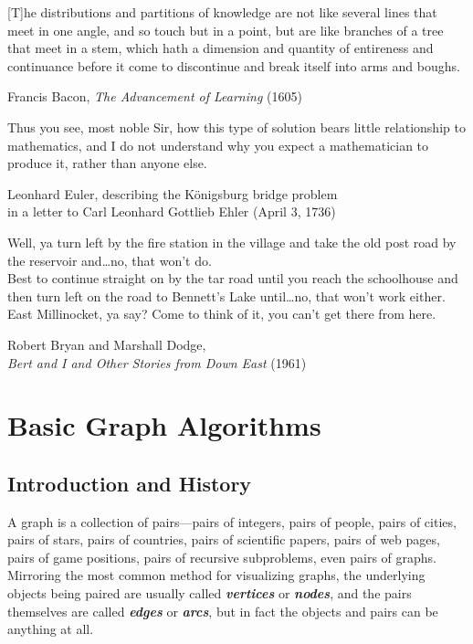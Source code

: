 \epigraph{[T]he distributions and partitions of knowledge are not like several lines that meet in one angle, and so touch but in a point, but are like branches of a tree that meet in a stem, which hath a dimension and quantity of entireness and continuance before it come to discontinue and break itself into arms and boughs.}{Francis Bacon, \textit{The Advancement of Learning} (1605)}

\epigraph{Thus you see, most noble Sir, how this type of solution bears little relationship to mathematics, and I do not understand why you expect a mathematician to produce it, rather than anyone else.}{Leonhard Euler, describing the Königsburg bridge problem\\in a letter to Carl Leonhard Gottlieb Ehler (April 3, 1736)}

\epigraph{Well, ya turn left by the fire station in the village and take the old post road by the reservoir and\dots no, that won’t do.\\Best to continue straight on by the tar road until you reach the schoolhouse and then turn left on the road to Bennett’s Lake until\dots no, that won’t work either.\\East Millinocket, ya say? Come to think of it, you can’t get there from here.}{Robert Bryan and Marshall Dodge,\\\textit{Bert and I and Other Stories from Down East} (1961)}

\chapter{Basic Graph Algorithms}
\label{ch:5}

\section{Introduction and History}
\label{sec:5.1}

A graph is a collection of pairs---pairs of integers, pairs of people, pairs of cities, pairs of stars, pairs of countries, pairs of scientific papers, pairs of web pages, pairs of game positions, pairs of recursive subproblems, even pairs of graphs.
Mirroring the most common method for visualizing graphs, the underlying objects being paired are usually called \textbf{\textit{vertices}} or \textbf{\textit{nodes}}, and the pairs themselves are called \textbf{\textit{edges}} or \textbf{\textit{arcs}}, but in fact the objects and pairs can be anything at all.

